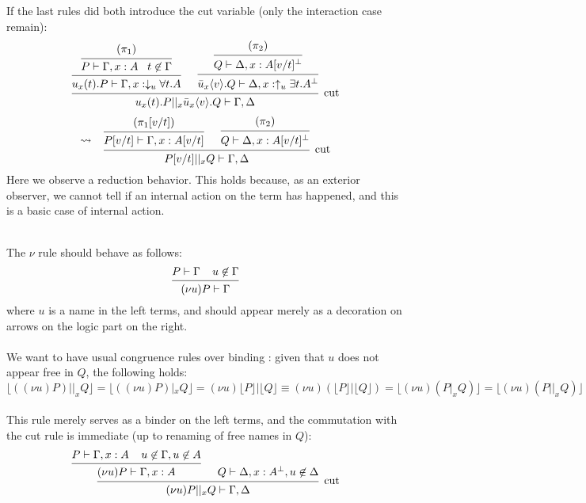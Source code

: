 \documentclass[a4paper,12pt]{article}
\begin{document}
\begin{myproof}
\begin{itemize}
\end{itemize}
If the last rules did both introduce the cut variable (only the interaction case remain):
\[
	\begin{prooftree}
				\hypo{(\pi_1)}
			\infer1{P \vdash \Gamma,x:A\;\;\; t\not\in\Gamma}
		\infer1{u_x(t).P \vdash \Gamma,x:\downarrow_u\forall t.A}
				\hypo{(\pi_2)}
			\infer1{Q \vdash \Delta,x:A[v/t]^\bot}
		\infer1{\bar{u}_x\langle v\rangle.Q \vdash \Delta,x:\uparrow_u\exists t.A^\bot}
	\infer2[cut]{u_x(t).P ||_x \bar{u}_x\langle v\rangle.Q \vdash \Gamma,\Delta}
	\end{prooftree}
\]\[
	\leadsto\;\;\;
	\begin{prooftree}
			\hypo{(\pi_1[v/t])}
		\infer1{P[v/t] \vdash \Gamma,x:A[v/t]}
			\hypo{(\pi_2)}
		\infer1{Q \vdash \Delta,x:A[v/t]^\bot}
	\infer2[cut]{P[v/t] ||_x Q \vdash \Gamma,\Delta}
	\end{prooftree}
\]
Here we observe a reduction behavior. This holds because, as an exterior observer, we cannot tell if an internal action on the term has happened, and this is a basic case of internal action.
\end{myproof}
~\\
The $\nu$ rule should behave as follows:\[
\begin{prooftree}
	\hypo{P \vdash \Gamma\;\;\;\; u \not\in \Gamma}
\infer1{(\nu u)P \vdash \Gamma}
\end{prooftree}\]
where $u$ is a name in the left terms, and should appear merely as a decoration on arrows on the logic part on the right.\\~\\
We want to have usual congruence rules over binding : given that $u$ does not appear free in $Q$, the following holds:
\[\lfloor ((\nu u)P) ||_x Q \rfloor = \lfloor ((\nu u)P) |_x Q \rfloor = (\nu u)\lfloor P \rfloor | \lfloor Q \rfloor \equiv (\nu u)(\lfloor P \rfloor|\lfloor Q \rfloor) = \lfloor (\nu u) (P |_x Q) \rfloor = \lfloor (\nu u) (P ||_x Q) \rfloor\]
~\\
This rule merely serves as a binder on the left terms, and the commutation with the cut rule is immediate (up to renaming of free names in $Q$):
\[\begin{prooftree}
		\hypo{P \vdash \Gamma, x:A\;\;\;\; u\not\in\Gamma,u\not\in A}
	\infer1{(\nu u)P \vdash \Gamma, x:A}
	\hypo{Q \vdash \Delta, x:A^\bot, u\not\in\Delta}
\infer2[cut]{(\nu u)P ||_x Q \vdash \Gamma,\Delta}
\end{prooftree}\]
\end{document}
